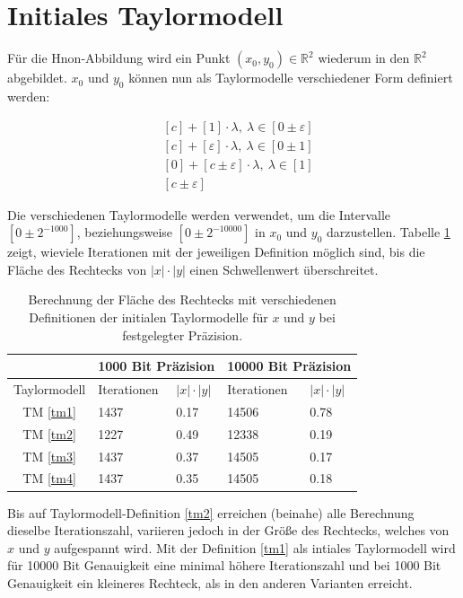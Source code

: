  \section{Initiales Taylormodell}
 
 Für die H\e non-Abbildung wird ein Punkt $(x_0,y_0) \in \mathbb{R}^2$ wiederum in den $\mathbb{R}^2$ abgebildet. $x_0$ und $y_0$ können nun als Taylormodelle verschiedener Form definiert werden:
 
 
 \begin{align}
  &[c] + [1] \cdot \lambda,\  \lambda \in [0 \pm \varepsilon] \label{tm1}\\
  &[c] + [\varepsilon] \cdot \lambda,\ \lambda \in [0 \pm 1] \label{tm2}\\
  &[0] + [c \pm \varepsilon] \cdot \lambda,\ \lambda \in [1] \label{tm3}\\
  &[c \pm \varepsilon]\label{tm4} 
 \end{align}


Die verschiedenen Taylormodelle werden verwendet, um die Intervalle $[0 \pm 2^{-1000}]$, beziehungsweise $[0\pm 2^{-10000}]$ in $x_0$ und $y_0$ darzustellen. Tabelle \ref{tab:tm} zeigt, wieviele Iterationen mit der jeweiligen Definition möglich sind, bis die Fläche des Rechtecks von $|x|\cdot|y|$ einen Schwellenwert überschreitet.
 
 
\begin{table}[tbh]
\centering
\begin{tabular}{|c||l|l||l|l|}
\hline
&\multicolumn{2}{c||}{1000 Bit Präzision} & \multicolumn{2}{c|}{10000 Bit Präzision} \\
\hline
Taylormodell & Iterationen & $|x| \cdot |y|$ &Iterationen & $|x| \cdot |y|$\\
\hline
TM \ref{tm1} & 1437 & 0.17 &14506 & 0.78 \\ 
TM \ref{tm2}  & 1227 & 0.49&12338 & 0.19  \\
TM \ref{tm3} & 1437 &  0.37&14505 & 0.17  \\                                                                 
TM \ref{tm4}  & 1437 & 0.35 &14505 & 0.18  \\
\hline 
\end{tabular}

\caption[Experimentelle Taylormodell Varianten]{Berechnung der Fläche des Rechtecks mit verschiedenen Definitionen der initialen Taylormodelle für $x$ und $y$ bei festgelegter Präzision.}
\label{tab:tm}
\end{table}
 
 
Bis auf Taylormodell-Definition \ref{tm2} erreichen (beinahe) alle Berechnung dieselbe Iterationszahl, variieren jedoch in der Größe des Rechtecks, welches von $x$ und $y$ aufgespannt wird. Mit der Definition \ref{tm1} als intiales Taylormodell wird für 10000 Bit Genauigkeit eine minimal höhere Iterationszahl und bei 1000 Bit Genauigkeit ein kleineres Rechteck, als in den anderen Varianten erreicht.
 
